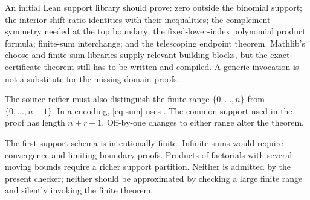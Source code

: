 An initial Lean support library should prove: zero outside the binomial
support; the interior shift-ratio identities with their inequalities; the
complement symmetry needed at the top boundary; the fixed-lower-index
polynomial product formula; finite-sum interchange; and the telescoping
endpoint theorem. Mathlib's choose and finite-sum libraries supply relevant
building blocks, but the exact certificate theorem still has to be written and
compiled. A generic  invocation is not a substitute for the
missing domain proofs.

The source reifier must also distinguish the finite range
$\{0,\ldots,n\}$ from $\{0,\ldots,n-1\}$. In a  encoding,
\eqref{eq:sum} uses . The common support used in the proof has
length $n+r+1$. Off-by-one changes to either range alter the theorem.

The first support schema is intentionally finite. Infinite sums would require
convergence and limiting boundary proofs. Products of factorials with several
moving bounds require a richer support partition. Neither is admitted by the
present checker; neither should be approximated by checking a large finite
range and silently invoking the finite theorem.
